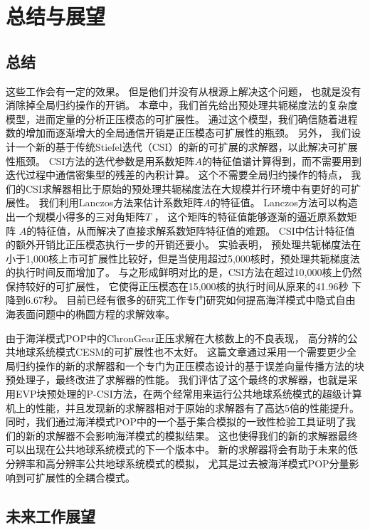 \chapter{总结与展望}
\label{cha:conclusion}

\section{总结}
\label{sec:conclude}


这些工作会有一定的效果。 
但是他们并没有从根源上解决这个问题， 也就是没有消除掉全局归约操作的开销。 
本章中，我们首先给出预处理共轭梯度法的复杂度模型，进而定量的分析正压模态的可扩展性。 
通过这个模型，我们确信随着进程数的增加而逐渐增大的全局通信开销是正压模态可扩展性的瓶颈。 
另外，  我们设计一个新的基于传统Stiefel迭代（CSI）的新的可扩展的求解器，以此解决可扩展性瓶颈。 
CSI方法的迭代参数是用系数矩阵$A$的特征值谱计算得到，而不需要用到迭代过程中通信密集型的残差的內积计算。
这个不需要全局归约操作的特点， 我们的CSI求解器相比于原始的预处理共轭梯度法在大规模并行环境中有更好的可扩展性。  
我们利用Lanczos方法来估计系数矩阵$A$的特征值。 
Lanczos方法可以构造出一个规模小得多的三对角矩阵$T$ ， 这个矩阵的特征值能够逐渐的逼近原系数矩阵 $A$的特征值，从而解决了直接求解系数矩阵特征值的难题。 
CSI中估计特征值的额外开销比正压模态执行一步的开销还要小。 
实验表明， 预处理共轭梯度法在小于1,000核上市可扩展性比较好，但是当使用超过5,000核时，预处理共轭梯度法的执行时间反而增加了。 
与之形成鲜明对比的是，CSI方法在超过10,000核上仍然保持较好的可扩展性， 它使得正压模态在15,000核的执行时间从原来的41.96秒 下降到6.67秒。    
目前已经有很多的研究工作专门研究如何提高海洋模式中隐式自由海表面问题中的椭圆方程的求解效率。 


由于海洋模式POP中的ChronGear正压求解在大核数上的不良表现， 高分辨的公共地球系统模式CESM的可扩展性也不太好。
这篇文章通过采用一个需要更少全局归约操作的新的求解器和一个专门为正压模态设计的基于误差向量传播方法的块预处理子，最终改进了求解器的性能。 
我们评估了这个最终的求解器，也就是采用EVP块预处理的P-CSI方法，在两个经常用来运行公共地球系统模式的超级计算机上的性能，并且发现新的求解器相对于原始的求解器有了高达5倍的性能提升。
同时，我们通过海洋模式POP中的一个基于集合模拟的一致性检验工具证明了我们的新的求解器不会影响海洋模式的模拟结果。 
这也使得我们的新的求解器最终可以出现在公共地球系统模式的下一个版本中。 
新的求解器将会有助于未来的低分辨率和高分辨率公共地球系统模式的模拟， 尤其是过去被海洋模式POP分量影响到可扩展性的全耦合模式。 



\section{未来工作展望}
\label{sec:futurework}

